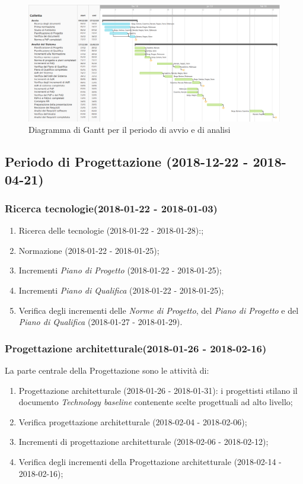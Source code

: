 	\newpage
	\begin{figure}[!hbtp]
		\centering
		\includegraphics[scale=0.5,angle=90]{images/ganttan.png}
		\caption{Diagramma di Gantt per il periodo di avvio e di analisi}
	\end{figure}
	\newpage
	\subsection{Periodo di Progettazione (2018-12-22 - 2018-04-21)}	
		\subsubsection{Ricerca tecnologie(2018-01-22 - 2018-01-03)\\} 
			\begin{enumerate}
				\item Ricerca delle tecnologie (2018-01-22 - 2018-01-28):;
				\item Normazione (2018-01-22 - 2018-01-25);
				\item Incrementi \textit{Piano di Progetto} (2018-01-22 - 2018-01-25);
				\item Incrementi \textit{Piano di Qualifica} (2018-01-22 - 2018-01-25);
				\item Verifica degli incrementi delle \textit{Norme di Progetto}, del \textit{Piano di Progetto} e del \textit{Piano di Qualifica} (2018-01-27 - 2018-01-29).
			\end{enumerate}
		\subsubsection{Progettazione architetturale(2018-01-26 - 2018-02-16)\\} La parte centrale della Progettazione sono le attività di:
			\begin{enumerate}
				\item Progettazione architetturale (2018-01-26 - 2018-01-31): i progettisti stilano il documento \textit{Technology baseline} contenente scelte progettuali ad alto livello;
				\item Verifica progettazione architetturale (2018-02-04 - 2018-02-06);
				\item Incrementi di progettazione architetturale (2018-02-06 - 2018-02-12);
				\item Verifica degli incrementi della Progettazione architetturale (2018-02-14 - 2018-02-16);
			\end{enumerate}
